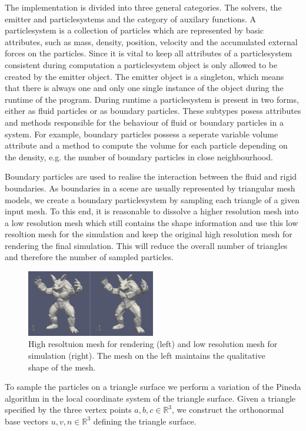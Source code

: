 \documentclass[11pt, letterpaper, twocolumn]{article}
\begin{document}
The implementation is divided into three general categories. The solvers, the emitter and particlesystems and the category of auxilary functions. A particlesystem is a collection of particles which are represented by basic attributes, such as mass, density, position, velocity and the accumulated external forces on the particles. Since it is vital to keep all attributes of a particlesystem consistent during computation a particlesystem object is only allowed to be created by the emitter object. The emitter object is a singleton, which means that there is always one and only one single instance of the object during the runtime of the program. During runtime a particlesystem is present in two forms, either as fluid particles or as boundary particles. These subtypes posess attributes and methods responsible for the behaviour of fluid or boundary particles in a system. For example, boundary particles possess a seperate variable volume attribute and a method to compute the volume for each particle depending on the density, e.g. the number of boundary particles in close neighbourhood.

Boundary particles are used to realise the interaction between the fluid and rigid boundaries. As boundaries in a scene are usually represented by triangular mesh models, we create a boundary particlesystem by sampling each triangle of a given input mesh. To this end, it is reasonable to dissolve a higher resolution mesh into a low resolution mesh which still contains the shape information and use this low resoltion mesh for the simulation and keep the original high resolution mesh for rendering the final simulation. This will reduce the overall number of triangles and therefore the number of sampled particles.

\begin{figure}[ht]
    \centering
    \includegraphics[width=0.5\textwidth]{images/mesh.png}
    \caption{High resoltuion mesh for rendering (left) and low resolution mesh for simulation (right). The mesh on the left maintains the qualitative shape of the mesh.}
    \label{fig:mesh}
\end{figure}


To sample the particles on a triangle surface we perform a variation of the Pineda algorithm \cite{pineda1988} in the local coordinate system of the triangle surface. Given a triangle specified by the three vertex points \(a, b, c \in \mathbb{R}^3\), we construct the orthonormal base vectors \(u,v,n \in \mathbb{R}^3\) defining the triangle surface. 
\end{document}
